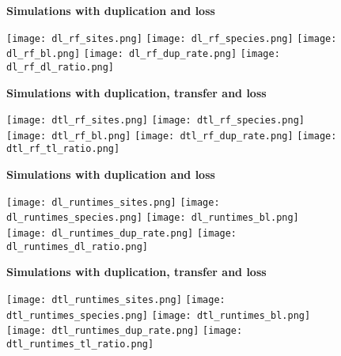 \documentclass[12pt,a4paper]{article}
\begin{document}
\newcommand*{\figuretitle}[1]{%
    {\centering%
    \textbf{#1}%
    \par\medskip}%
}



\begin{figure}
\figuretitle{Simulations with duplication and loss}
\texttt{[image: dl\_rf\_sites.png]}
\texttt{[image: dl\_rf\_species.png]}
\texttt{[image: dl\_rf\_bl.png]}
\texttt{[image: dl\_rf\_dup\_rate.png]}
\texttt{[image: dl\_rf\_dl\_ratio.png]}
\end{figure}


\begin{figure}
\figuretitle{Simulations with duplication, transfer and loss}
\texttt{[image: dtl\_rf\_sites.png]}
\texttt{[image: dtl\_rf\_species.png]}
\texttt{[image: dtl\_rf\_bl.png]}
\texttt{[image: dtl\_rf\_dup\_rate.png]}
\texttt{[image: dtl\_rf\_tl\_ratio.png]}
\end{figure}



\begin{figure}
\figuretitle{Simulations with duplication and loss}
\texttt{[image: dl\_runtimes\_sites.png]}
\texttt{[image: dl\_runtimes\_species.png]}
\texttt{[image: dl\_runtimes\_bl.png]}
\texttt{[image: dl\_runtimes\_dup\_rate.png]}
\texttt{[image: dl\_runtimes\_dl\_ratio.png]}
\end{figure}


\begin{figure}
\figuretitle{Simulations with duplication, transfer and loss}
\texttt{[image: dtl\_runtimes\_sites.png]}
\texttt{[image: dtl\_runtimes\_species.png]}
\texttt{[image: dtl\_runtimes\_bl.png]}
\texttt{[image: dtl\_runtimes\_dup\_rate.png]}
\texttt{[image: dtl\_runtimes\_tl\_ratio.png]}
\end{figure}
\end{document}
